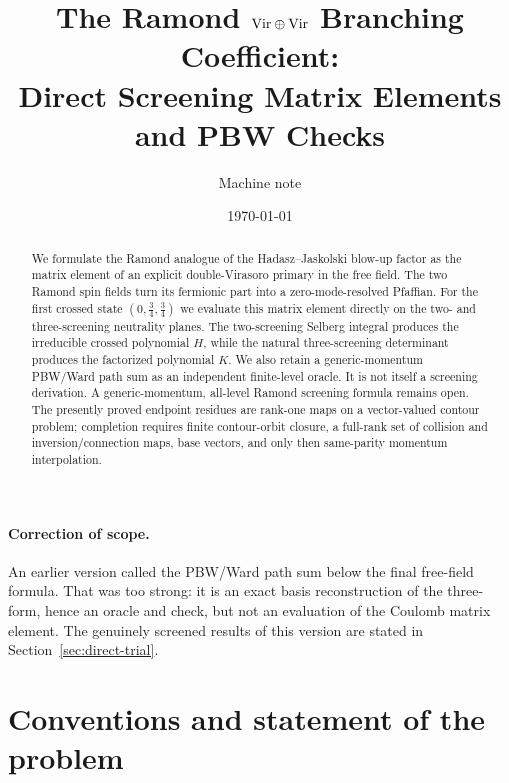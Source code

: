 \documentclass[11pt]{article}
\title{The Ramond $\mathrm{Vir}\oplus\mathrm{Vir}$ Branching Coefficient:\\
Direct Screening Matrix Elements and PBW Checks}
\author{Machine note}
\date{\today}
\begin{document}
\maketitle

\begin{abstract}
We formulate the Ramond analogue of the Hadasz--Jaskolski blow-up factor as
the matrix element of an explicit double-Virasoro primary in the free field.
The two Ramond spin fields turn its fermionic part into a zero-mode-resolved
Pfaffian.  For the first crossed state $(0,\frac34,\frac34)$ we evaluate this
matrix element directly on the two- and three-screening neutrality planes.
The two-screening Selberg integral produces the irreducible crossed
polynomial $H$, while the natural three-screening determinant produces the
factorized polynomial $K$.  We also retain a generic-momentum PBW/Ward path
sum as an independent finite-level oracle.  It is not itself a screening
derivation.  A generic-momentum, all-level Ramond screening formula remains
open.  The presently proved endpoint residues are rank-one maps on a
vector-valued contour problem; completion requires finite contour-orbit
closure, a full-rank set of collision and inversion/connection maps, base
vectors, and only then same-parity momentum interpolation.
\end{abstract}

\paragraph{Correction of scope.}
An earlier version called the PBW/Ward path sum below the final free-field
formula.  That was too strong: it is an exact basis reconstruction of the
three-form, hence an oracle and check, but not an evaluation of the Coulomb
matrix element.  The genuinely screened results of this version are stated
in Section~\ref{sec:direct-trial}.

\section{Conventions and statement of the problem}
\end{document}
